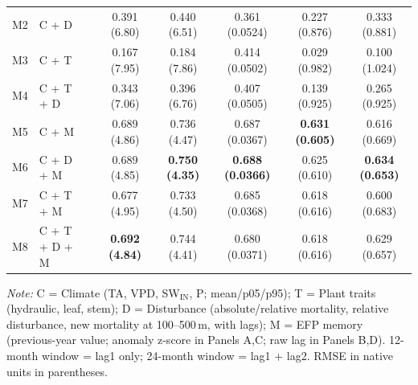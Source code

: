 \begin{table}[htbp]
\begin{tabular}{llcccccc}
M2 & C + D &  & 0.391 (6.80) & 0.440 (6.51) & 0.361 (0.0524) & 0.227 (0.876) & 0.333 (0.881) \\
M3 & C + T &  & 0.167 (7.95) & 0.184 (7.86) & 0.414 (0.0502) & 0.029 (0.982) & 0.100 (1.024) \\
M4 & C + T + D &  & 0.343 (7.06) & 0.396 (6.76) & 0.407 (0.0505) & 0.139 (0.925) & 0.265 (0.925) \\
M5 & C + M &  & 0.689 (4.86) & 0.736 (4.47) & 0.687 (0.0367) & \textbf{0.631 (0.605)} & 0.616 (0.669) \\
M6 & C + D + M &  & 0.689 (4.85) & \textbf{0.750 (4.35)} & \textbf{0.688 (0.0366)} & 0.625 (0.610) & \textbf{0.634 (0.653)} \\
M7 & C + T + M &  & 0.677 (4.95) & 0.733 (4.50) & 0.685 (0.0368) & 0.618 (0.616) & 0.600 (0.683) \\
M8 & C + T + D + M &  & \textbf{0.692 (4.84)} & 0.744 (4.41) & 0.680 (0.0371) & 0.618 (0.616) & 0.629 (0.657) \\
\midrule
\bottomrule
\end{tabular}
\vspace{2pt}
\begin{minipage}{\linewidth}
\footnotesize
\textit{Note:} C = Climate (TA, VPD, SW$_\mathrm{IN}$, P; mean/p05/p95); T = Plant traits (hydraulic, leaf, stem); D = Disturbance (absolute/relative mortality, relative disturbance, new mortality at 100--500\,m, with lags); M = EFP memory (previous-year value; anomaly z-score in Panels A,C; raw lag in Panels B,D). 12-month window = lag1 only; 24-month window = lag1 + lag2. RMSE in native units in parentheses.
\end{minipage}
\end{table}


